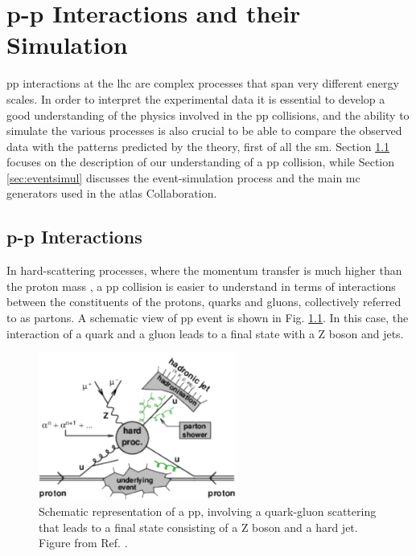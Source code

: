 \chapter{p-p Interactions and their Simulation}
\label{chap:event:MC}

\Gls{pp} interactions at the \gls{lhc} are complex processes that span very different energy scales. 
In order to interpret the experimental data it is essential to develop a good understanding of the physics involved in the \gls{pp} collisions, and the ability to simulate the various processes is also crucial to be able to compare the observed data with the patterns predicted by the theory, first of all the \gls{sm}.
Section \ref{sec:ppint} focuses on the description of our understanding of a \gls{pp} collision, while Section \ref{sec:eventsimul} 
discusses the event-simulation process and the main \gls{mc} generators used in the \gls{atlas} Collaboration. 



\section{p-p Interactions}
\label{sec:ppint}

In hard-scattering processes, where the momentum transfer is much higher than the proton mass \cite{Butterworth:2012fj}, 
a \gls{pp} collision is easier to understand in terms of interactions between the constituents of the protons, quarks and gluons, 
collectively referred to as partons. A schematic view of \gls{pp} event is shown in Fig. \ref{fig:sim:pp2}. In this case, the interaction of a quark and a gluon leads to a final state with a Z boson and jets. 

\begin{figure}[h]
\begin{center}
    \includegraphics[width=0.58\textwidth]{figures/simul/ppcoll2}
\end{center}
 \caption{Schematic representation of a \gls{pp}, involving a quark-gluon scattering that leads to a final state consisting of a Z boson and a hard jet. Figure from Ref. \cite{Butterworth:2012fj}.}
  \label{fig:sim:pp2}
\end{figure}

